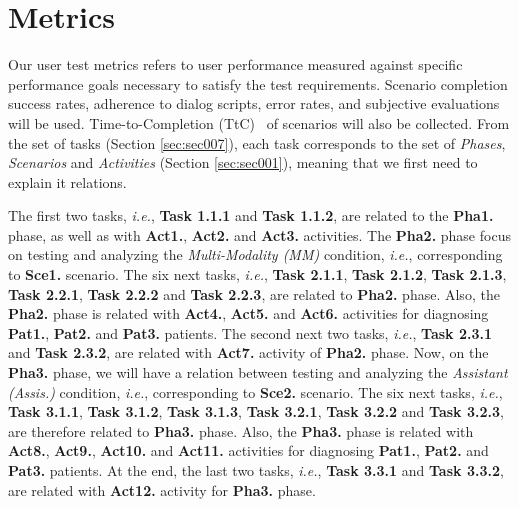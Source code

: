 
\section{Metrics}
\label{sec:sec008}

Our user test metrics refers to user performance measured against specific performance goals necessary to satisfy the test requirements. Scenario completion success rates, adherence to dialog scripts, error rates, and subjective evaluations will be used. Time-to-Completion (TtC)~\cite{ioannidis1998effect} of scenarios will also be collected. From the set of tasks (Section \ref{sec:sec007}), each task corresponds to the set of {\it Phases}, {\it Scenarios} and {\it Activities} (Section \ref{sec:sec001}), meaning that we first need to explain it relations.

The first two tasks, {\it i.e.}, {\bf Task 1.1.1} and {\bf Task 1.1.2}, are related to the {\bf Pha1.} phase, as well as with {\bf Act1.}, {\bf Act2.} and {\bf Act3.} activities. The {\bf Pha2.} phase focus on testing and analyzing the {\it Multi-Modality (MM)} condition, {\it i.e.}, corresponding to {\bf Sce1.} scenario. The six next tasks, {\it i.e.}, {\bf Task 2.1.1}, {\bf Task 2.1.2}, {\bf Task 2.1.3}, {\bf Task 2.2.1}, {\bf Task 2.2.2} and {\bf Task 2.2.3}, are related to {\bf Pha2.} phase. Also, the {\bf Pha2.} phase is related with {\bf Act4.}, {\bf Act5.} and {\bf Act6.} activities for diagnosing {\bf Pat1.}, {\bf Pat2.} and {\bf Pat3.} patients. The second next two tasks, {\it i.e.}, {\bf Task 2.3.1} and {\bf Task 2.3.2}, are related with {\bf Act7.} activity of {\bf Pha2.} phase. Now, on the {\bf Pha3.} phase, we will have a relation between testing and analyzing the {\it Assistant (Assis.)} condition, {\it i.e.}, corresponding to {\bf Sce2.} scenario. The six next tasks, {\it i.e.}, {\bf Task 3.1.1}, {\bf Task 3.1.2}, {\bf Task 3.1.3}, {\bf Task 3.2.1}, {\bf Task 3.2.2} and {\bf Task 3.2.3}, are therefore related to {\bf Pha3.} phase. Also, the {\bf Pha3.} phase is related with {\bf Act8.}, {\bf Act9.}, {\bf Act10.} and {\bf Act11.} activities for diagnosing {\bf Pat1.}, {\bf Pat2.} and {\bf Pat3.} patients. At the end, the last two tasks, {\it i.e.}, {\bf Task 3.3.1} and {\bf Task 3.3.2}, are related with {\bf Act12.} activity for {\bf Pha3.} phase.

